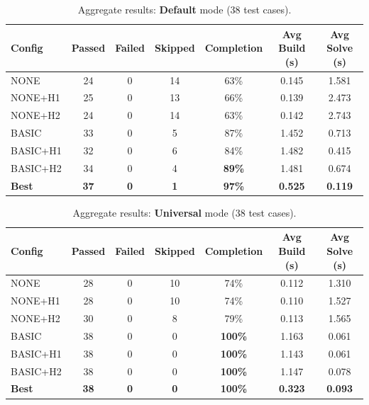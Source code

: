 \begin{table}[H]
\centering
\caption{Aggregate results: \textbf{Default} mode (38 test cases).}
\label{tab:agg-default-m3}
\begin{tabular}{lcccccc}
\toprule
\textbf{Config} & \textbf{Passed} & \textbf{Failed} & \textbf{Skipped} & \textbf{Completion} & \textbf{Avg Build (s)} & \textbf{Avg Solve (s)} \\
\midrule
NONE     & 24 & 0 & 14 & 63\% & 0.145 & 1.581 \\
NONE+H1  & 25 & 0 & 13 & 66\% & 0.139 & 2.473 \\
NONE+H2  & 24 & 0 & 14 & 63\% & 0.142 & 2.743 \\
BASIC    & 33 & 0 &  5 & 87\% & 1.452 & 0.713 \\
BASIC+H1 & 32 & 0 &  6 & 84\% & 1.482 & 0.415 \\
BASIC+H2 & 34 & 0 &  4 & \textbf{89\%} & 1.481 & 0.674 \\
\midrule
\textbf{Best} & \textbf{37} & \textbf{0} & \textbf{1} & \textbf{97\%} & \textbf{0.525} & \textbf{0.119} \\
\bottomrule
\end{tabular}
\end{table}
\vspace{-2em}
\begin{table}[H]
\centering
\caption{Aggregate results: \textbf{Universal} mode (38 test cases).}
\label{tab:agg-universal-m3}
\begin{tabular}{lcccccc}
\toprule
\textbf{Config} & \textbf{Passed} & \textbf{Failed} & \textbf{Skipped} & \textbf{Completion} & \textbf{Avg Build (s)} & \textbf{Avg Solve (s)} \\
\midrule
NONE     & 28 & 0 & 10 &  74\% & 0.112 & 1.310 \\
NONE+H1  & 28 & 0 & 10 &  74\% & 0.110 & 1.527 \\
NONE+H2  & 30 & 0 &  8 &  79\% & 0.113 & 1.565 \\
BASIC    & 38 & 0 &  0 & \textbf{100\%} & 1.163 & 0.061 \\
BASIC+H1 & 38 & 0 &  0 & \textbf{100\%} & 1.143 & 0.061 \\
BASIC+H2 & 38 & 0 &  0 & \textbf{100\%} & 1.147 & 0.078 \\
\midrule
\textbf{Best} & \textbf{38} & \textbf{0} & \textbf{0} & \textbf{100\%} & \textbf{0.323} & \textbf{0.093} \\
\bottomrule
\end{tabular}
\end{table}
\vspace{-2em}
